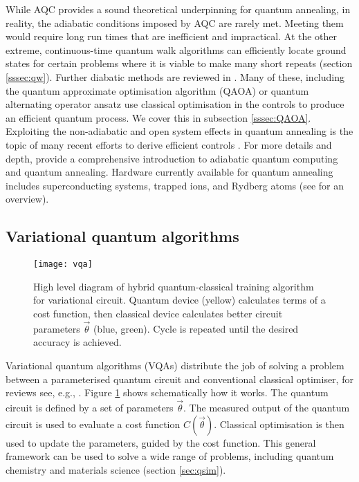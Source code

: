 \documentclass[10pt]{iopart}
\begin{document}
While AQC provides a sound theoretical underpinning for quantum annealing, in reality, the adiabatic conditions imposed by AQC are rarely met. Meeting them would require long run times that are inefficient and impractical. At the other extreme, continuous-time quantum walk algorithms \cite{Farhi1998} can efficiently locate ground states for certain problems \cite{Callison2019} where it is viable to make many short repeats (section \ref{sssec:qw}). Further diabatic methods are reviewed in \cite{Crosson2020}. Many of these, including the quantum approximate optimisation algorithm (QAOA) or quantum alternating operator ansatz \cite{Farhi2014,Hadfield2019} use classical optimisation in the controls to produce an efficient quantum process. We cover this in subsection \ref{sssec:QAOA}. Exploiting the non-adiabatic and open system effects in quantum annealing is the topic of many recent efforts to derive efficient controls \cite{Banks2023,Schulz2023}.
For more details and depth, \citeauthor{Albash2018} \cite{Albash2018} provide a comprehensive introduction to adiabatic quantum computing and quantum annealing. Hardware currently available for quantum annealing includes superconducting systems, trapped ions, and Rydberg atoms (see \cite{Hauke2020} for an overview).


\subsection{Variational quantum algorithms}\label{ssec:VQAs}

\begin{figure}[ht!]
\centering
\texttt{[image: vqa]}
\caption{High level diagram of hybrid quantum-classical training algorithm for variational circuit. Quantum device (yellow) calculates terms of a cost function, then classical device calculates better circuit parameters $\vec{\theta}$ (blue, green). Cycle is repeated until the desired accuracy is achieved.}
\label{fig:variationalcircuit}
\end{figure}

Variational quantum algorithms (VQAs) distribute the job of solving a problem between a parameterised quantum circuit and conventional classical optimiser, for reviews see, e.g., \cite{Endo2021,Cerezo2021}. Figure \ref{fig:variationalcircuit} shows schematically how it works.  The quantum circuit is defined by a set of parameters $\vec{\theta}$. The measured output of the quantum circuit is used to evaluate a cost function $C(\vec{\theta})$.  Classical optimisation is then used to update the parameters, guided by the cost function. This general framework can be used to solve a wide range of problems, including quantum chemistry and materials science \cite{Kokail2019,Kandala2017} (section \ref{sec:qsim}).
\end{document}

